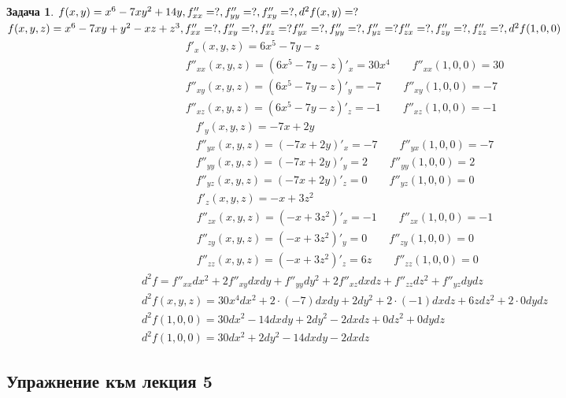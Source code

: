 \documentclass[a4paper,fleqn,12pt]{article}
\theoremstyle{definition}
\newtheorem{task}{Задача}[subsection]
\begin{document}
\begin{task}
$f(x,y) = x^6 - 7xy^2 + 14y,\\
f''_{xx} = ?, f''_{yy} = ?, f''_{xy} = ?, d^2f(x,y) = ?$\\
$f(x,y,z) = x^6 - 7xy +y^2 - xz + z^3 ,  \\
f''_{xx} = ?, f''_{xy} = ?, f''_{xz} = ?  f''_{yx} = ?, f''_{yy} = ?, f''_{yz} = ?  f''_{zx} = ?, f''_{zy} = ?, f''_{zz} = ?, d^2f(1,0,0)$
\begin{gather*}
f'_x(x,y,z) = 6x^5 - 7y - z\\
f''_{xx}(x,y,z) = (6x^5 - 7y - z)'_x = 30x^4 \qquad f''_{xx}(1,0,0) = 30 \\
f''_{xy}(x,y,z) = (6x^5 - 7y - z)'_y = -7 \qquad f''_{xy}(1,0,0) = -7 \\
f''_{xz}(x,y,z) = (6x^5 - 7y - z)'_z = -1 \qquad f''_{xz}(1,0,0) = -1 
\end{gather*}
\begin{gather*}
f'_y(x,y,z) = -7x + 2y\\
f''_{yx}(x,y,z) = (-7x + 2y)'_x = -7 \qquad f''_{yx}(1,0,0) = -7 \\
f''_{yy}(x,y,z) = (-7x + 2y)'_y = 2 \qquad f''_{yy}(1,0,0) = 2 \\
f''_{yz}(x,y,z) = (-7x + 2y)'_z = 0\qquad f''_{yz}(1,0,0) = 0 
\end{gather*}
\begin{gather*}
f'_z(x,y,z) = -x + 3z^2\\
f''_{zx}(x,y,z) = (-x + 3z^2)'_x = -1 \qquad f''_{zx}(1,0,0) = -1 \\
f''_{zy}(x,y,z) = (-x + 3z^2)'_y = 0 \qquad f''_{zy}(1,0,0) = 0 \\
 f''_{zz}(x,y,z) = (-x + 3z^2)'_z = 6z  \qquad f''_{zz}(1,0,0) = 0 
\end{gather*}
\begin{gather*}
d^2f = f''_{xx}dx^2 + 2f''_{xy}dxdy + f''_{yy}dy^2 + 2f''_{xz}dxdz +  f''_{zz}dz^2 + f''_{yz}dydz\\
d^2f(x,y,z) = 30x^4dx^2 +2\cdot(-7) dxdy + 2dy^2 + 2\cdot(-1)dxdz + 6zdz^2 + 2\cdot 0 dydz \\
d^2f(1,0,0) = 30dx^2 -14dxdy + 2dy^2 - 2dxdz + 0dz^2 + 0 dydz \\
d^2f(1,0,0) = 30dx^2 + 2dy^2 -14dxdy - 2dxdz 
\end{gather*}

\end{task}
\newpage

\subsection{Упражнение към лекция 5}
\end{document}
